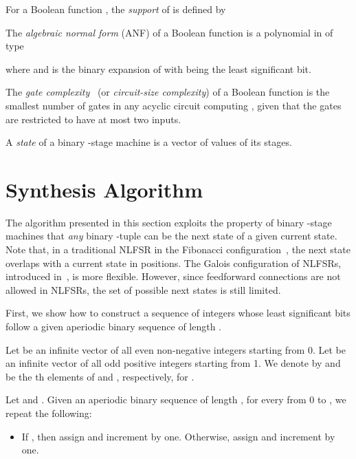 \documentclass[twocolumn]{IEEEtran} \usepackage{epsfig}
\begin{document}
For a Boolean function , the {\em support} of  is defined by 


The {\em algebraic normal form} (ANF) of a Boolean function  is a polynomial in  of type

where  and  is the binary
expansion of  with  being the least significant bit. 

The {\em gate complexity}~\cite{massey_talk}  (or {\em circuit-size complexity}) of a Boolean function  is the smallest 
number of gates in any acyclic circuit computing , given that the 
gates are restricted to have at most two inputs.

A {\em state} of a binary -stage machine is a vector of values of its  stages.

\section{Synthesis Algorithm} \label{syn_alg}

The algorithm presented in this section exploits the property of binary
-stage machines that {\em  any} binary -tuple can be the next state of 
a given current state. Note that, in a traditional NLFSR in the Fibonacci configuration~\cite{Golomb_book}, the next state
overlaps with a current state in  positions.
The Galois configuration of NLFSRs, introduced in~\cite{Du09j}, is more flexible.
However, since feedforward connections are not allowed in NLFSRs,
the set of possible next states is still limited.

First, we show how to construct a sequence of integers 
whose least significant bits follow a given aperiodic binary sequence of length .


Let  be an infinite vector of all even non-negative integers starting from 0.  
Let  be an infinite vector of all odd positive integers starting from 1.  
We denote by  and  be the th elements of  and , respectively,
for .

Let  and .  Given an aperiodic binary sequence  of length , for every  from 0 to , we repeat the following: 

\begin{itemize}
\item[]
If , then assign  
and increment  by one. Otherwise, assign  
and increment  by one. 
\end{itemize}
\end{document}
